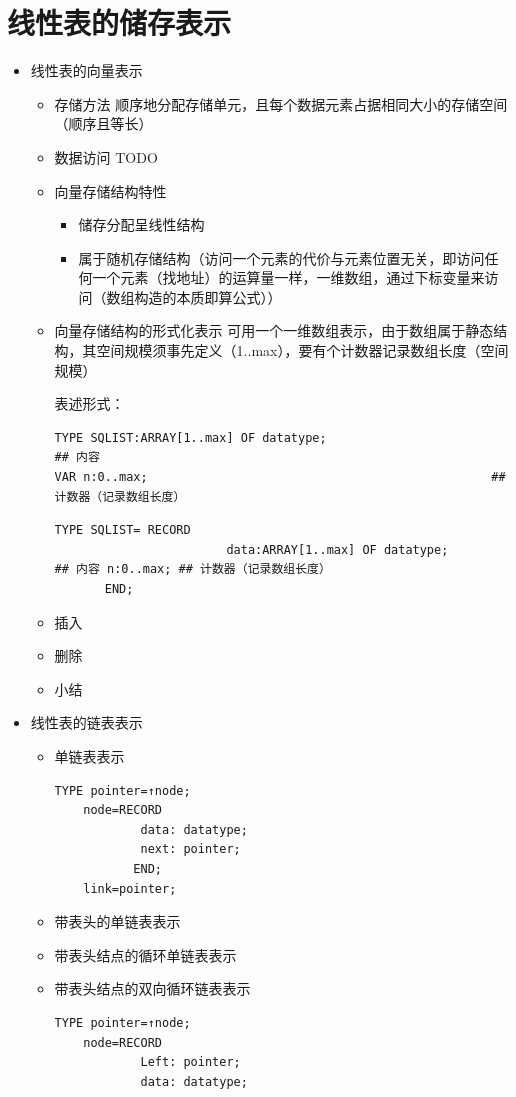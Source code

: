 \documentclass[AutoFakeBold]{LZUThesis2007}
\begin{document}
	\section{线性表的储存表示}
\begin{itemize}
	\item 线性表的向量表示
		\begin{itemize}
			\item 存储方法
			顺序地分配存储单元，且每个数据元素占据相同大小的存储空间（顺序且等长）

			\item 数据访问
			TODO
			\item 向量存储结构特性
				\begin{itemize}
					\item 储存分配呈线性结构
					\item 属于随机存储结构（访问一个元素的代价与元素位置无关，即访问任何一个元素（找地址）的运算量一样，一维数组，通过下标变量来访问（数组构造的本质即算公式））

				\end{itemize}
			\item 向量存储结构的形式化表示
			可用一个一维数组表示，由于数组属于静态结构，其空间规模须事先定义（1..max），要有个计数器记录数组长度（空间规模）

			表述形式：
\begin{lstlisting}
TYPE SQLIST:ARRAY[1..max] OF datatype;							## 内容
VAR n:0..max;				                                 ## 计数器（记录数组长度）
\end{lstlisting}
\begin{lstlisting}
TYPE SQLIST= RECORD 
						data:ARRAY[1..max] OF datatype;
## 内容 n:0..max; ## 计数器（记录数组长度） 
       END;
\end{lstlisting}
			\item 插入
			\item 删除
			\item 小结
		\end{itemize}

	\item 线性表的链表表示
		\begin{itemize}
			\item 单链表表示
\begin{lstlisting}
TYPE pointer=↑node;
	node=RECORD 
			data: datatype;
			next: pointer;
		   END; 
	link=pointer;
\end{lstlisting}
			\item 带表头的单链表表示
			\item 带表头结点的循环单链表表示
			\item 带表头结点的双向循环链表表示
\begin{lstlisting}
TYPE pointer=↑node;
	node=RECORD 
			Left: pointer;
			data: datatype;
			

\end{lstlisting}
\end{itemize}
\end{itemize}
\end{document}
